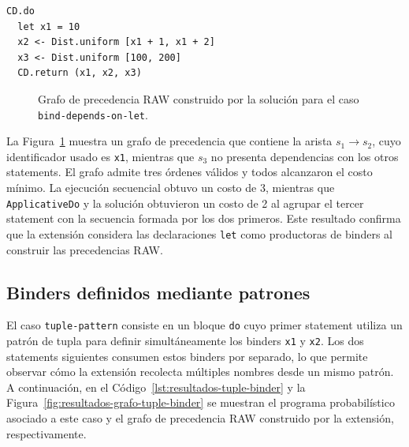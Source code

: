 \begin{lstlisting}[style=haskell,caption={Programa probabilístico asociado al caso \texttt{bind-depends-on-let}.},label={lst:resultados-bind-depends-on-let}]
CD.do
  let x1 = 10
  x2 <- Dist.uniform [x1 + 1, x1 + 2]
  x3 <- Dist.uniform [100, 200]
  CD.return (x1, x2, x3)
\end{lstlisting}

\begin{figure}[ht]
\centering
\begin{PrecedenceGraph}[node distance=0.5cm and 0.6cm]
\end{PrecedenceGraph}
\caption[Grafo RAW del caso \texttt{bind-depends-on-let}.]{Grafo de precedencia RAW construido por la solución para el caso \texttt{bind-depends-on-let}.}
\label{fig:resultados-grafo-bind-depends-on-let}
\end{figure}

La Figura~\ref{fig:resultados-grafo-bind-depends-on-let} muestra un grafo de precedencia que contiene la arista $s_1\to s_2$, cuyo identificador usado es \texttt{x1}, mientras que $s_3$ no presenta dependencias con los otros statements. El grafo admite tres órdenes válidos y todos alcanzaron el costo mínimo. La ejecución secuencial obtuvo un costo de 3, mientras que \texttt{ApplicativeDo} y la solución obtuvieron un costo de 2 al agrupar el tercer statement con la secuencia formada por los dos primeros. Este resultado confirma que la extensión considera las declaraciones \texttt{let} como productoras de binders al construir las precedencias RAW.

\subsection{Binders definidos mediante patrones}

El caso \texttt{tuple-pattern} consiste en un bloque \texttt{do} cuyo primer statement utiliza un patrón de tupla para definir simultáneamente los binders \texttt{x1} y \texttt{x2}. Los dos statements siguientes consumen estos binders por separado, lo que permite observar cómo la extensión recolecta múltiples nombres desde un mismo patrón. A continuación, en el Código~\ref{lst:resultados-tuple-binder} y la Figura~\ref{fig:resultados-grafo-tuple-binder} se muestran el programa probabilístico asociado a este caso y el grafo de precedencia RAW construido por la extensión, respectivamente.

